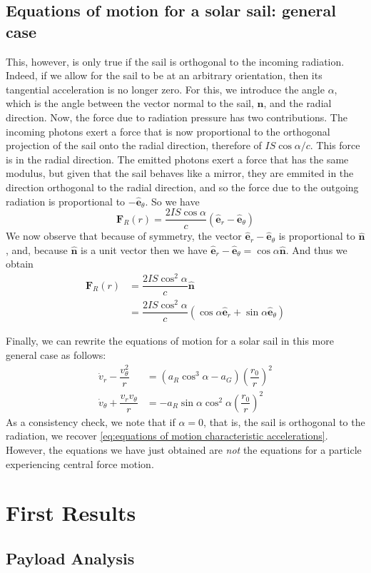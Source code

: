 \documentclass[twocolumn,12pt,a4paper]{article}
\numberwithin{equation}{section}
\begin{document}
\subsection{Equations of motion for a solar sail: general case}
This, however, is only true if the sail is orthogonal to the incoming radiation. Indeed, if we allow for the sail to be at an arbitrary orientation, then its tangential acceleration is no longer zero. For this, we introduce the angle \( \alpha \), which is the angle between the vector normal to the sail, \( \hat{\mathbf{n}} \), and the radial direction. Now, the force due to radiation pressure has two contributions. The incoming photons exert a force that is now proportional to the orthogonal projection of the sail onto the radial direction, therefore of \( IS\cos{\alpha}/c \). This force is in the radial direction. The emitted photons exert a force that has the same modulus, but given that the sail behaves like a mirror, they are emmited in the direction orthogonal to the radial direction, and so the force due to the outgoing radiation is proportional to \( {-\hat{\mathbf{e}}_{\theta}} \). So we have
\begin{equation}
  \mathbf{F}_R(r) = \dfrac{2IS \cos{\alpha}}{c} ( \hat{\mathbf{e}}_{r} - \hat{\mathbf{e}}_{\theta})
\end{equation}
We now observe that because of symmetry, the vector \( \hat{\mathbf{e}}_{r} - \hat{\mathbf{e}}_{\theta}  \) is proportional to \( \hat{\mathbf{n}} \), and, because \( \hat{\mathbf{n}} \) is a unit vector then we have \( \hat{\mathbf{e}}_{r} - \hat{\mathbf{e}}_{\theta} = \cos{\alpha} \hat{\mathbf{n}} \). 
And thus we obtain
\begin{align}
  \mathbf{F}_R(r) &= \dfrac{2IS \cos^2{\alpha}}{c} \hat{\mathbf{n}} \\
									&= \dfrac{2IS \cos^2{\alpha}}{c} (\cos{\alpha} \hat{\mathbf{e}}_r + \sin{\alpha} \hat{\mathbf{e}}_{\theta}) 
\end{align}

Finally, we can rewrite the equations of motion for a solar sail in this more general case as follows:
\begin{align*}
  \dot{v}_r - \dfrac{v_{\theta}^2}{r} &= (a_R \cos^3{\alpha} - a_G) \left(\dfrac{r_0}{r}\right)^2 \\ 
  \dot{v}_{\theta} + \dfrac{v_r v_{\theta}}{r} &= -a_R	\sin{\alpha} \cos^2{\alpha} \left(\dfrac{r_0}{r}\right)^2
\end{align*}
As a consistency check,  we note that if \( \alpha = 0 \), that is, the sail is orthogonal to the radiation, we recover \autoref{eq:equations of motion characteristic accelerations}. However, the equations we have just obtained are \emph{not} the equations for a particle experiencing central force motion.   

\section{First Results}
\subsection{Payload Analysis}



\end{document}
